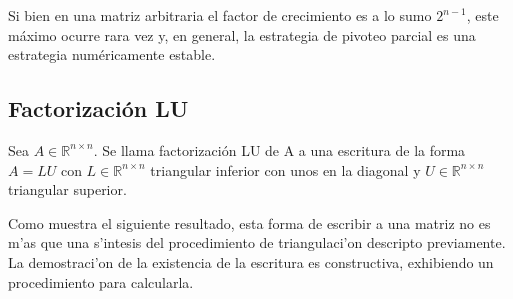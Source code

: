 Si bien en una matriz arbitraria el factor de crecimiento es a lo sumo $2^{n - 1}$, este máximo ocurre rara vez y, en general, la estrategia de pivoteo parcial es una estrategia numéricamente estable.

\subsection{Factorización LU}

\begin{defi}
Sea $A \in \mathbb{R}^{n \times n}$. Se llama factorización LU de A a una escritura de la forma $A = LU$ con $L \in \mathbb{R}^{n \times n}$ triangular inferior con unos en la diagonal y $U \in \mathbb{R}^{n \times n}$ triangular superior.
\end{defi}

Como muestra el siguiente resultado, esta forma de escribir a una matriz no es m'as que una s'intesis del procedimiento de triangulaci'on descripto previamente. La demostraci'on de la existencia de la escritura es constructiva, exhibiendo un procedimiento para calcularla.

